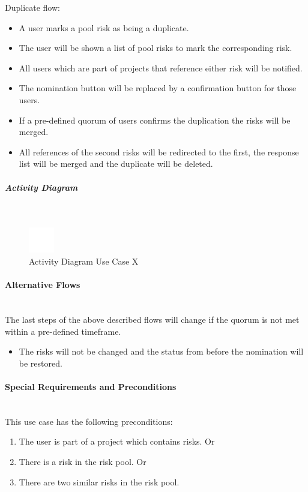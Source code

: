 Duplicate flow:
\begin{itemize}
	\vspace{-3mm}
	\setlength\itemsep{-1em}
	\item A user marks a pool risk as being a duplicate.
	\item The user will be shown a list of pool risks to mark the corresponding risk.
	\item All users which are part of projects that reference either risk will be notified.
	\item The nomination button will be replaced by a confirmation button for those users.
	\item If a pre-defined quorum of users confirms the duplication the risks will be merged.
	\item All references of the second risks will be redirected to the first, the response list will be merged and the duplicate will be deleted.
\end{itemize}

\subparagraph{Activity Diagram}\mbox{}\\
\begin{figure}[h]
	\centering
	\includegraphics[width=0.1\textwidth]{Content/Domain/placeholder.png}
	\caption{Activity Diagram Use Case X}
	\label{fig:label55}
\end{figure}

\paragraph*{Alternative Flows}\mbox{}\\
The last steps of the above described flows will change if the quorum is not met within a pre-defined timeframe.
\begin{itemize}
	\vspace{-3mm}
	\setlength\itemsep{-1em}
	\item The risks will not be changed and the status from before the nomination will be restored.
\end{itemize}
	
\paragraph*{Special Requirements and Preconditions}\mbox{}\\
This use case has the following preconditions:
\begin{enumerate}
	\vspace{-3mm}
	\setlength\itemsep{-1em}
	\item The user is part of a project which contains risks.
	Or
	\item There is a risk in the risk pool.
	Or
	\item There are two similar risks in the risk pool.
\end{enumerate}

